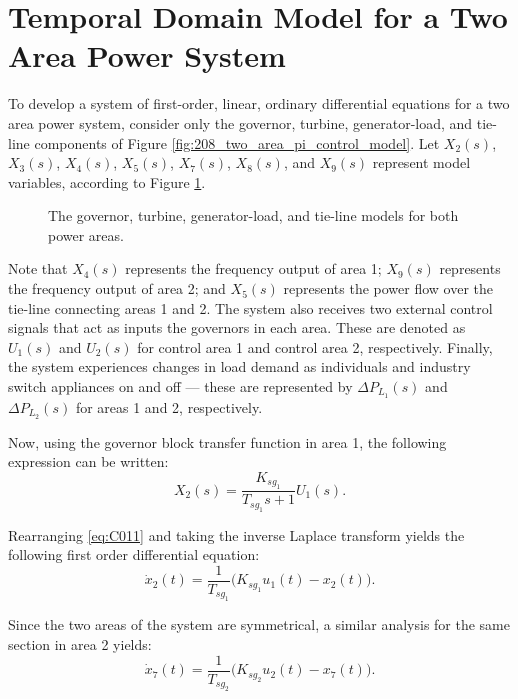 \section{Temporal Domain Model for a Two Area Power System} \label{app:C1_power_system_ode}

To develop a system of first-order, linear, ordinary differential equations for a two area power system, consider only the governor, turbine, generator-load, and tie-line components of Figure \ref{fig:208_two_area_pi_control_model}. Let $X_2(s)$, $X_3(s)$, $X_4(s)$, $X_5(s)$, $X_7(s)$, $X_8(s)$, and $X_9(s)$ represent model variables, according to Figure \ref{fig:C101}.

\begin{figure}[h]
	\centering
	\resizebox{\textwidth}{!}{}
	\caption[Combined governor, turbine, generator-load, and tie-line for a two power area system]{The governor, turbine, generator-load, and tie-line models for both power areas.}
	\label{fig:C101}
\end{figure}

Note that $X_4(s)$ represents the frequency output of area 1; $X_9(s)$ represents the frequency output of area 2; and $X_5(s)$ represents the power flow over the tie-line connecting areas 1 and 2. The system also receives two external control signals that act as inputs the governors in each area. These are denoted as $U_1(s)$ and $U_2(s)$ for control area 1 and control area 2, respectively. Finally, the system experiences changes in load demand as individuals and industry switch appliances on and off --- these are represented by $\Delta P_{L_1}(s)$ and $\Delta P_{L_2}(s)$ for areas 1 and 2, respectively.

Now, using the governor block transfer function in area 1, the following expression can be written:
\begin{equation}
	X_2(s) = \frac{K_{sg_1}}{T_{sg_1}s + 1} U_1(s). \label{eq:C011}
\end{equation}

Rearranging \ref{eq:C011} and taking the inverse Laplace transform yields the following first order differential equation:
\begin{equation}
	\dot{x}_2(t) = \frac{1}{T_{sg_1}}\big( K_{sg_1} u_1(t) - x_2(t) \big). \label{eq:C012}
\end{equation}

Since the two areas of the system are symmetrical, a similar analysis for the same section in area 2 yields:
\begin{equation}
	\dot{x}_7(t) = \frac{1}{T_{sg_2}}\big( K_{sg_2} u_2(t) - x_7(t) \big). \label{eq:C013}
\end{equation}

